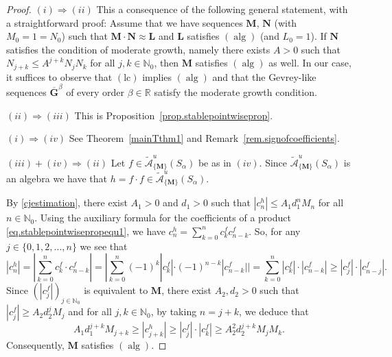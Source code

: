 \documentclass[11pt,a4paper]{article}
\theoremstyle{plain}
\theoremstyle{definition}
\newcommand{\RR}{\mathbb{R}}
\newcommand{\NN}{\mathbb{N}}
\newcommand{\M}{\mathbf{M}}
\newcommand{\G}{\mathbf{G}}
\let\on=\operatorname
\begin{document}
\begin{proof}
$(i)\Rightarrow(ii)$ This a consequence of the following general statement, with a straightforward proof: Assume that we have sequences $\mathbf{M}$, $\mathbf{N}$ (with $M_0=1=N_0$) such that $\mathbf{M}\cdot\mathbf{N}\approx\mathbf{L}$ and $\mathbf{L}$ satisfies \hyperlink{s-alg}{$(\on{alg})$} (and $L_0=1$). If $\mathbf{N}$ satisfies the condition of moderate growth, namely there exists $A>0$ such that $N_{j+k}\le A^{j+k}N_jN_k$ for all $j,k\in\NN_0$, then $\mathbf{M}$ satisfies \hyperlink{s-alg}{$(\on{alg})$} as well. In our case, it suffices to observe that \hyperlink{lc}{$(\text{lc})$} implies \hyperlink{s-alg}{$(\on{alg})$} and that the Gevrey-like sequences $\overline{\G}^{\beta}$ of every order $\beta\in\RR$ satisfy the moderate growth condition.


$(ii)\Rightarrow(iii)$ This is  Proposition~\ref{prop.stablepointwiseprop}.

$(i)\Rightarrow(iv)$ See Theorem~\ref{mainTthm1} and Remark~\ref{rem.signofcoefficients}.

$(iii)+(iv)\Rightarrow(ii)$ Let $f\in \mathcal{\widetilde{A}}^{u}_{\{\M\}} (S_\alpha)$ be as in $(iv)$. Since $\mathcal{\widetilde{A}}^{u}_{\{\M\}} (S_\alpha)$ is an algebra we have that $h= f\cdot f \in \mathcal{\widetilde{A}}^{u}_{\{\M\}} (S_\alpha)$.

By \eqref{cjestimation}, there exist $A_1>0$ and $d_1>0$ such that $|c^h_n|\le A_1d_1^nM_n$ for all $n\in\NN_0$. Using the auxiliary formula for the coefficients of a product \eqref{eq.stablepointwisepropequ1}, we have $c^h_n = \sum_{k=0}^n c^f_k c^f_{n-k}$. So, for any $j\in\{0,1,2,\dots,n\}$ we see that
$$|c^h_n|=|\sum_{k=0}^n c^f_k \cdot c^f_{n-k}| = |\sum_{k=0}^n  (-1)^k|c^f_k| \cdot (-1)^{n-k} |c^f_{n-k}|| = \sum_{k=0}^n |c^f_k| \cdot |c^f_{n-k}|  \ge |c^f_j| \cdot |c^f_{n-j}|.$$
Since $(|c^f_j|)_{j\in\NN_0}$ is equivalent to $\M$, there exist $A_2,d_2>0$ such that $|c^f_j|\geq A_2 d_2^j M_j$ and for all $j,k\in\NN_0$, by taking $n=j+k$, we deduce that 
 $$A_1d_1^{j+k}M_{j+k} \geq |c^h_{j+k}| \ge |c^f_j| \cdot |c^f_{k}|\ge A_2^2 d_2^{j+k} M_j M_k.$$
 Consequently, $\M$ satisfies \hyperlink{s-alg}{$(\on{alg})$}.
\end{proof}
 
\end{document}
